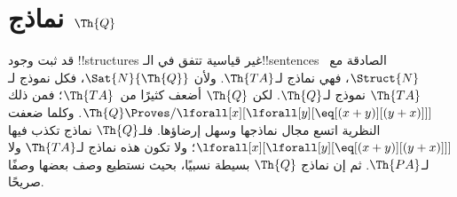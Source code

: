 \documentclass[../../../include/open-logic-section]{subfiles}
\begin{document}
\section{نماذج $\Th{Q}$}

\begin{explain}
قد ثبت وجود !!{structure}s غير قياسية تتفق في
الـ!!{sentence}s الصادقة مع~$\Struct{N}$، فهي نماذج لـ$\Th{TA}$.
ولأن $\Sat{N}{\Th{Q}}$، فكل نموذج لـ$\Th{TA}$ نموذج
لـ$\Th{Q}$. لكن $\Th{Q}$ أضعف كثيرًا من~$\Th{TA}$؛ فمن ذلك
$\Th{Q} \Proves/ \lforall[x][\lforall[y][\eq[(x + y)][(y+x)]]]$.
وكلما ضعفت النظرية اتسع مجال نماذجها وسهل إرضاؤها.
فلـ$\Th{Q}$ نماذج تكذب فيها
$\lforall[x][\lforall[y][\eq[(x + y)][(y+x)]]]$؛ ولا تكون
هذه نماذج لـ$\Th{TA}$ ولا لـ$\Th{PA}$. ثم إن نماذج
$\Th{Q}$ بسيطة نسبيًا، بحيث نستطيع وصف بعضها وصفًا صريحًا.
\end{explain}
\end{document}
